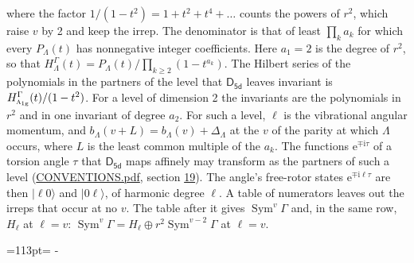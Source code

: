 \documentclass[10pt,a4paper]{article}
\newcommand{\needspace}[1]{\par\penalty-100\begingroup\dimen0=#1\relax\dimen2=\pagegoal
  \advance\dimen2-\pagetotal\ifdim\dimen0>\dimen2\relax\ifdim\dimen2>0pt\vfil\break\fi\fi
  \endgroup}
\numberwithin{equation}{section}
\newcommand{\grp}[1]{\mathsf{#1}}
\newcommand{\irr}[1]{\text{\normalfont\scshape #1}}
\newcommand{\ptag}[1]{\mathrm{#1}}
\newcommand{\iunit}{\mathrm{i}}
\newcommand{\expe}{\mathrm{e}}
\newcommand{\occ}[1]{\lvert #1\rangle}
\begin{document}
where the factor $1/(1 - t^2) = 1 + t^2 + t^4 + \dots$ counts the powers of $r^2$, which raise $v$ by 2 and keep the irrep. The denominator is that of least $\prod_k a_k$ for which every $P_\Lambda(t)$ has nonnegative integer coefficients. Here $a_1 = 2$ is the degree of $r^2$, so that $H^{\Gamma}_\Lambda(t) = P_\Lambda(t)/\prod_{k\ge2}(1 - t^{a_k})$. The Hilbert series of the polynomials in the partners of the level that $\grp{D_{5d}}$ leaves invariant is $H^{\Gamma}_{\irr{a}_{1\ptag{g}}}(t)/(1 - t^2)$. For a level of dimension 2 the invariants are the polynomials in $r^2$ and in one invariant of degree $a_2$. \label{n:index.overtone.period}\label{n:index.increment.unitary}For such a level, $\ell$ is the vibrational angular momentum, and $b_\Lambda(v + L) = b_\Lambda(v) + \Delta_\Lambda$ at the $v$ of the parity at which $\Lambda$ occurs, where $L$ is the least common multiple of the $a_k$. \label{n:local.torsion.angle}The functions $\expe^{\mp\iunit\tau}$ of a torsion angle $\tau$ that $\grp{D_{5d}}$ maps affinely may transform as the partners of such a level (\href{../../CONVENTIONS.pdf}{CONVENTIONS.pdf}, section \href{../../CONVENTIONS.pdf\#conv.19}{19}). The angle's free-rotor states $\expe^{\mp\iunit\ell\tau}$ are then $\occ{\ell 0}$ and $\occ{0 \ell}$, of harmonic degree $\ell$. A table of numerators leaves out the irreps that occur at no $v$. The table after it gives $\operatorname{Sym}^{v}\Gamma$ and, in the same row, $H_\ell$ at $\ell = v$: $\operatorname{Sym}^{v}\Gamma = H_\ell \oplus r^2\operatorname{Sym}^{v-2}\Gamma$ at $\ell = v$.
\needspace{113pt}
\end{document}
